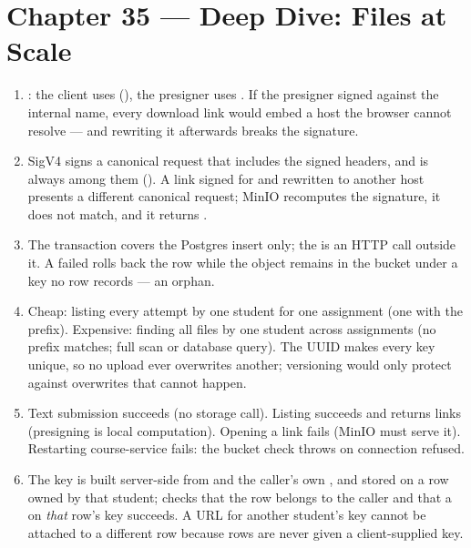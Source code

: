 \section*{Chapter 35 --- Deep Dive: Files at Scale}
\begin{enumerate}
  \item {}: the client uses 
  (), the presigner uses . If
  the presigner signed against the internal name, every download link
  would embed a host the browser cannot resolve --- and rewriting it
  afterwards breaks the signature.
  \item SigV4 signs a canonical request that includes the signed
  headers, and  is always among them
  (). A link signed for
   and rewritten to another host presents a different
  canonical request; MinIO recomputes the signature, it does not match,
  and it returns .
  \item The transaction covers the Postgres insert only; the
   is an HTTP call outside it. A failed 
  rolls back the row while the object remains in the bucket under a
  key no row records --- an orphan.
  \item Cheap: listing every attempt by one student for one assignment
  (one  with the prefix). Expensive: finding all
  files by one student across assignments (no prefix matches; full
  scan or database query). The UUID makes every key unique, so no
  upload ever overwrites another; versioning would only protect against
  overwrites that cannot happen.
  \item Text submission succeeds (no storage call). Listing succeeds and
  returns links (presigning is local computation). Opening a link fails
  (MinIO must serve it). Restarting course-service fails: the
   bucket check throws on connection refused.
  \item The key is built server-side from  and the
  caller's own , and stored on a 
  row owned by that student;  checks that the row
  belongs to the caller and that a  on \emph{that} row's key
  succeeds. A URL for another student's key cannot be attached to a
  different row because rows are never given a client-supplied key.
\end{enumerate}

